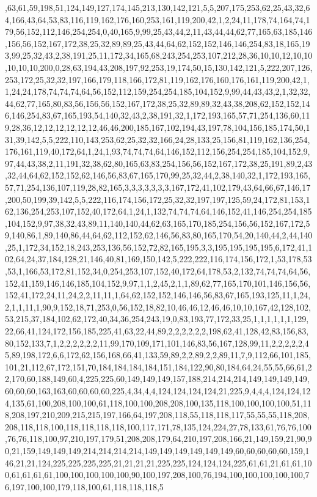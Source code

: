 ,63,61,59,198,51,124,149,127,174,145,213,130,142,121,5,5,207,175,253,62,25,43,32,64,166,43,64,53,83,116,119,162,176,160,253,161,119,200,42,1,2,24,11,178,74,164,74,179,56,152,112,146,254,254,0,40,165,9,99,25,43,44,2,11,43,44,44,62,77,165,63,185,146,156,56,152,167,172,38,25,32,89,89,25,43,44,64,62,152,152,146,146,254,83,18,165,193,99,25,32,43,2,38,191,25,11,172,34,165,68,243,254,253,107,212,28,36,10,10,12,10,10,10,10,10,200,0,28,63,194,43,208,197,92,253,19,174,50,15,130,142,121,5,222,207,126,253,172,25,32,32,197,166,179,118,166,172,81,119,162,176,160,176,161,119,200,42,1,1,24,24,178,74,74,74,64,56,152,112,159,254,254,185,104,152,9,99,44,43,43,2,1,32,32,44,62,77,165,80,83,56,156,56,152,167,172,38,25,32,89,89,32,43,38,208,62,152,152,146,146,254,83,67,165,193,54,140,32,43,2,38,191,32,1,172,193,165,57,71,254,136,60,119,28,36,12,12,12,12,12,12,46,46,200,185,167,102,194,43,197,78,104,156,185,174,50,131,39,142,5,5,222,110,143,253,62,25,32,32,166,24,28,133,25,156,81,119,162,136,254,176,161,119,40,172,64,1,24,1,93,74,74,74,64,146,152,112,156,254,254,185,104,152,9,97,44,43,38,2,11,191,32,38,62,80,165,63,83,254,156,56,152,167,172,38,25,191,89,2,43,32,44,64,62,152,152,62,146,56,83,67,165,170,99,25,32,44,2,38,140,32,1,172,193,165,57,71,254,136,107,119,28,82,165,3,3,3,3,3,3,3,167,172,41,102,179,43,64,66,67,146,17,200,50,199,39,142,5,5,222,116,174,156,172,25,32,32,197,197,125,59,24,172,81,153,162,136,254,253,107,152,40,172,64,1,24,1,132,74,74,74,64,146,152,41,146,254,254,185,104,152,9,97,38,32,43,89,11,140,140,44,62,63,165,170,185,254,156,56,152,167,172,59,140,86,1,89,140,86,44,64,62,112,152,62,146,56,83,80,165,170,54,20,140,44,2,44,140,25,1,172,34,152,18,243,253,136,56,152,72,82,165,195,3,3,195,195,195,195,6,172,41,102,64,24,37,184,128,21,146,40,81,169,150,142,5,222,222,116,174,156,172,1,53,178,53,53,1,166,53,172,81,152,34,0,254,253,107,152,40,172,64,178,53,2,132,74,74,74,64,56,152,41,159,146,146,185,104,152,9,97,1,1,2,45,2,1,1,89,62,77,165,170,101,146,156,56,152,41,172,24,11,24,2,2,11,11,1,64,62,152,152,146,146,56,83,67,165,193,125,11,1,24,2,1,1,11,1,90,9,152,18,71,253,0,56,152,18,82,10,46,46,12,46,46,10,10,167,42,128,102,53,215,37,184,102,62,172,40,34,36,254,243,19,0,83,193,77,172,33,25,1,1,1,1,1,1,129,22,66,41,124,172,156,185,225,41,63,22,44,89,2,2,2,2,2,2,198,62,41,128,42,83,156,83,80,152,133,7,1,2,2,2,2,2,2,11,99,170,109,171,101,146,83,56,167,128,99,11,2,2,2,2,2,45,89,198,172,6,6,172,62,156,168,66,41,133,59,89,2,2,89,2,2,89,11,7,9,112,66,101,185,101,21,112,67,172,151,70,184,184,184,184,151,184,122,90,80,184,64,24,55,55,66,61,22,170,60,188,149,60,4,225,225,60,149,149,149,157,188,214,214,214,149,149,149,149,60,60,60,163,163,60,60,60,60,225,4,34,4,4,124,124,124,124,21,225,9,4,4,4,124,124,124,135,61,100,208,100,100,61,118,100,100,208,208,100,135,118,100,100,100,100,51,118,208,197,210,209,215,215,197,166,64,197,208,118,55,118,118,117,55,55,55,118,208,208,118,118,100,118,118,118,118,100,117,171,78,135,124,224,27,78,133,61,76,76,100,76,76,118,100,97,210,197,179,51,208,208,179,64,210,197,208,166,21,149,159,21,90,90,21,159,149,149,149,214,214,214,214,149,149,149,149,149,149,60,60,60,60,60,159,146,21,21,124,225,225,225,225,21,21,21,21,225,225,124,124,124,225,61,61,21,61,61,100,61,61,61,61,100,100,100,100,100,90,100,197,208,100,76,194,100,100,100,100,100,76,197,100,100,179,118,100,61,118,118,118,5